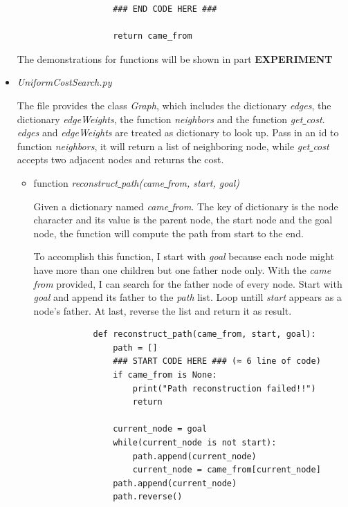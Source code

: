 \documentclass[aps,letterpaper,10pt]{revtex4}
\newcommand{\RNum}[1]{\uppercase\expandafter{\romannumeral #1\relax}}
\begin{document}
\begin{itemize}
\begin{itemize}
\begin{lstlisting}
				### END CODE HERE ###
				
				return came_from
		\end{lstlisting}
		
	\end{itemize}

	The demonstrations for functions  will be shown in part \textbf{\RNum{2} EXPERIMENT} 

	\item \emph{UniformCostSearch.py}
	
	The file provides the class \emph{Graph}, which includes the dictionary \emph{edges}, the dictionary \emph{edgeWeights}, the function \emph{neighbors} and the function \emph{get\underline{ }cost}.
	\emph{edges} and \emph{edgeWeights} are treated as dictionary to look up. 
	Pass in an id to function \emph{neighbors}, it will return a list of neighboring node, while \emph{get\underline{ }cost} accepts two adjacent nodes and returns the cost.

	\begin{itemize}
		\item function \emph{reconstruct\underline{ }path(came\underline{ }from, start, goal)}
		
		Given a dictionary named \emph{came\underline{ }from}. The key of dictionary is the node 
    	character and its value is the parent node, the start node
		and the goal node, the function will compute the path from start to the end.


		\vspace{3mm}
		To accomplish this function, I start with \emph{goal} because each node might have more than one children 
		but one father node only. With the \emph{came\underline{ }from} provided, I can search for the father node of every node.
		Start with \emph{goal} and append its father to the \emph{path} list. Loop untill \emph{start} appears as a node's father.
		At last, reverse the list and return it as result.

		\begin{lstlisting}
			def reconstruct_path(came_from, start, goal):
				path = []
				### START CODE HERE ### (≈ 6 line of code)
				if came_from is None:
					print("Path reconstruction failed!!")
					return 

				current_node = goal
				while(current_node is not start):
					path.append(current_node)
					current_node = came_from[current_node]
				path.append(current_node)
				path.reverse()


\end{lstlisting}
\end{itemize}
\end{itemize}
\end{document}
